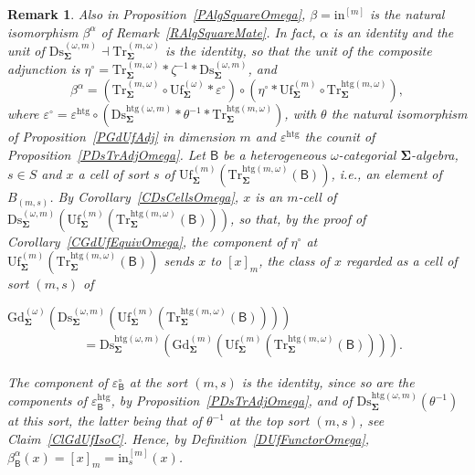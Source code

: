 \documentclass[a4paper, reqno]{amsbook}
\newcommand{\sig}[1]{\mathbf{#1}}             %
\newcommand{\calg}[1]{\boldsymbol{\mathsf{#1}}} %
\newcommand{\htg}{\mathrm{htg}}                %
\newcommand{\Gd}{\mathrm{Gd}}
\newcommand{\Uf}{\mathrm{Uf}}
\newcommand{\Ds}{\mathrm{Ds}}
\newcommand{\Tr}{\mathrm{Tr}}
\theoremstyle{plain}
\newtheorem{remark}[theorem]{Remark}
\theoremstyle{definition}
\begin{document}
\begin{remark}\label{RAlgSquareOmegaMate}
Also in Proposition~\ref{PAlgSquareOmega}, $\beta=\mathrm{in}^{[m]}$ is the natural isomorphism $\beta^{\alpha}$ of Remark~\ref{RAlgSquareMate}.
In fact, $\alpha$ is an identity and the unit of $\Ds^{(\omega,m)}_{\sig{\Sigma}}\dashv\Tr^{(m,\omega)}_{\sig{\Sigma}}$ is the identity, so that the unit of the composite adjunction is $\eta^{\circ}=\Tr^{(m,\omega)}_{\sig{\Sigma}}\ast\zeta^{-1}\ast\Ds^{(\omega,m)}_{\sig{\Sigma}}$, and
$$
\beta^{\alpha}=\left(\Tr^{(m,\omega)}_{\sig{\Sigma}}\circ\Uf^{(\omega)}_{\sig{\Sigma}}\ast\varepsilon^{\circ}\right)\circ\left(\eta^{\circ}\ast\Uf^{(m)}_{\sig{\Sigma}}\circ\Tr^{\htg(m,\omega)}_{\sig{\Sigma}}\right),
$$
where $\varepsilon^{\circ}=\varepsilon^{\htg}\circ(\Ds^{\htg(\omega,m)}_{\sig{\Sigma}}\ast\theta^{-1}\ast\Tr^{\htg(m,\omega)}_{\sig{\Sigma}})$, with $\theta$ the natural isomorphism of Proposition~\ref{PGdUfAdj} in dimension $m$ and $\varepsilon^{\htg}$ the counit of Proposition~\ref{PDsTrAdjOmega}.
Let $\calg{B}$ be a heterogeneous $\omega$-categorial $\sig{\Sigma}$-algebra, $s\in S$ and $x$ a cell of sort $s$ of $\Uf^{(m)}_{\sig{\Sigma}}(\Tr^{\htg(m,\omega)}_{\sig{\Sigma}}(\calg{B}))$, i.e., an element of $B_{(m,s)}$.
By Corollary~\ref{CDsCellsOmega}, $x$ is an $m$-cell of $\Ds^{(\omega,m)}_{\sig{\Sigma}}(\Uf^{(m)}_{\sig{\Sigma}}(\Tr^{\htg(m,\omega)}_{\sig{\Sigma}}(\calg{B})))$, so that, by the proof of Corollary~\ref{CGdUfEquivOmega}, the component of $\eta^{\circ}$ at $\Uf^{(m)}_{\sig{\Sigma}}(\Tr^{\htg(m,\omega)}_{\sig{\Sigma}}(\calg{B}))$ sends $x$ to $[x]_{m}$, the class of $x$ regarded as a cell of sort $(m,s)$ of
\begin{flushleft}
$
\Gd^{(\omega)}_{\sig{\Sigma}}\left(\Ds^{(\omega,m)}_{\sig{\Sigma}}\left(\Uf^{(m)}_{\sig{\Sigma}}\left(\Tr^{\htg(m,\omega)}_{\sig{\Sigma}}(\calg{B})\right)\right)\right)
$
\begin{align*}
&=
\Ds^{\htg(\omega,m)}_{\sig{\Sigma}}\left(\Gd^{(m)}_{\sig{\Sigma}}\left(\Uf^{(m)}_{\sig{\Sigma}}\left(\Tr^{\htg(m,\omega)}_{\sig{\Sigma}}(\calg{B})\right)\right)\right).
\end{align*}
\end{flushleft}
The component of $\varepsilon^{\circ}_{\calg{B}}$ at the sort $(m,s)$ is the identity, since so are the components of $\varepsilon^{\htg}_{\calg{B}}$, by Proposition~\ref{PDsTrAdjOmega}, and of $\Ds^{\htg(\omega,m)}_{\sig{\Sigma}}(\theta^{-1})$ at this sort, the latter being that of $\theta^{-1}$ at the top sort $(m,s)$, see Claim~\ref{ClGdUfIsoC}.
Hence, by Definition~\ref{DUfFunctorOmega}, $\beta^{\alpha}_{\calg{B}}(x)=[x]_{m}=\mathrm{in}^{[m]}_{s}(x)$.
\end{remark}
\end{document}
